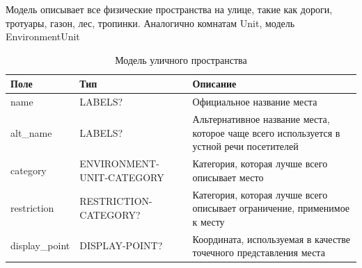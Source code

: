        Модель описывает все физические пространства на улице, такие как дороги, тротуары, газон, лес, тропинки. Аналогично комнатам Unit, модель EnvironmentUnit
        \begin{center}
          \begin{xltabular}{\linewidth}{|l|p{4cm}|X|}
            \caption{Модель уличного пространства}\\\hline
            Поле           & Тип                       & Описание                                                                                 \\ \hline
            name           & LABELS?                   & Официальное название места                                                               \\ \hline
            alt\_name      & LABELS?                   & Альтернативное название места, которое чаще всего используется в устной речи посетителей \\ \hline
            category       & ENVIRONMENT-UNIT-CATEGORY & Категория, которая лучше всего описывает место                                           \\ \hline
            restriction    & RESTRICTION-CATEGORY?     & Категория, которая лучше всего описывает ограничение, применимое к месту                 \\ \hline
            display\_point & DISPLAY-POINT?            & Координата, используемая в качестве точечного представления места                         \\ \hline
          \end{xltabular}
        \end{center}

